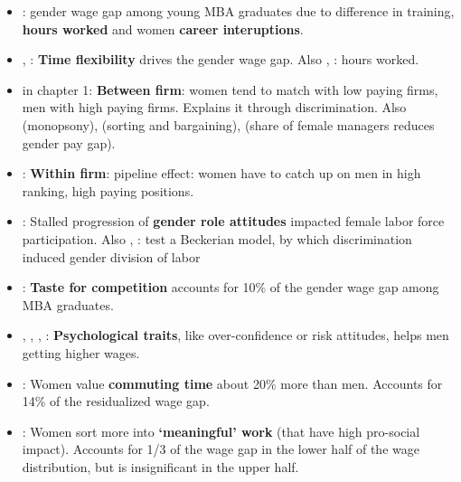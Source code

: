 \documentclass[12pt]{article}
\begin{document}
  \begin{itemize}
  \item \cite{bertrandDynamicsGenderGap2010}: gender wage gap among young MBA graduates due to difference in training, \textbf{hours worked} and women \textbf{career interuptions}. 
    \item \cite{goldinGrandGenderConvergence2014}, \cite{wiswallPreferenceWorkplaceInvestment2018}: \textbf{Time flexibility} drives the gender wage gap. Also \cite{denningReturnHoursWorked2022}, \cite{wassermanHoursConstraintsOccupational2022} \cite{mannasooWorkingHoursGender2022}: hours worked.
    \item \cite{blauGenderInequalityWages2012} in chapter 1: \textbf{Between firm}: women tend to match with low paying firms, men with high paying firms. Explains it through discrimination. Also \cite{webberFirmLevelMonopsonyGender2016} (monopsony), \cite{cardBargainingSortingGender2015} (sorting and bargaining), \cite{theodoropoulosAreWomenDoing2022} (share of female managers reduces gender pay gap).
    \item \cite{dasWomenPipelineDynamic2023}: \textbf{Within firm}: pipeline effect: women have to catch up on men in high ranking, high paying positions.
    \item \cite{fortinGenderRoleAttitudes2015}: Stalled progression of \textbf{gender role attitudes} impacted female labor force participation. Also \cite{kamalAttitudesPersonalityAustralian2022}, \cite{siminskiSpecializationComparativeAdvantage2022}: test a Beckerian model, by which discrimination induced gender division of labor
    \item \cite{reubenTasteCompetitionGender2019}: \textbf{Taste for competition} accounts for 10\% of the gender wage gap among MBA graduates.
    \item \cite{adamecz-volgyiGenderGapTop2022}, \cite{lavettiGenderDifferencesSorting2022}, \cite{kamalAttitudesPersonalityAustralian2022}, \cite{exleyGenderGapSelfPromotion2022}: \textbf{Psychological traits}, like over-confidence or risk attitudes, helps men getting higher wages.
    \item \cite{barbanchonGenderDifferencesJob2021}: Women value \textbf{commuting time} about 20\% more than men. Accounts for 14\% of the residualized wage gap.
    \item \cite{burbanoGenderGapMeaningful2022}: Women sort more into \textbf{‘meaningful' work} (that have high pro-social impact). Accounts for 1/3 of the wage gap in the lower half of the wage distribution, but is insignificant in the upper half.

\end{itemize}
\end{document}
